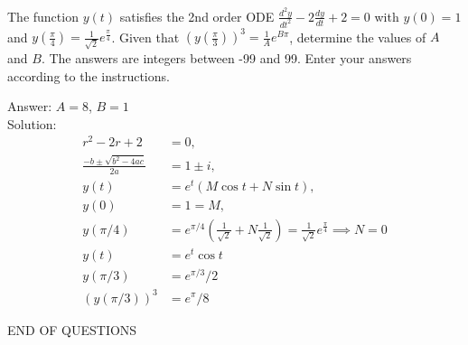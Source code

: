 \documentclass{uob-cs-exam}
\begin{document}
\begin{questions}



\question[5]
The function $y(t)$ satisfies the 2nd order ODE $\frac{d^2y}{dt^2} -2\frac{dy}{dt} +2=0$ with $y(0)=1$ and $y\left( \frac{\pi}{4} \right) = \frac{1}{\sqrt{2}}e^{\frac{\pi}{4}}$.
Given that $\left( y \left( \frac{\pi}{3} \right)\right)^3 = \frac{1}{A}e^{B \pi}$, determine the values of $A$ and $B$. The answers are integers between -99 and 99. Enter your answers according to the instructions.

\droppoints

\begin{solution}
Answer: $A=8$, $B=1$\\
Solution:\\
\begin{align*}
  r^2-2r+2 &= 0, \\
  \frac{-b \pm \sqrt{b^2 - 4ac}}{2a} &= 1 \pm i, \\
  y(t) &= e^t \left(M \cos t + N \sin t \right), \\
  y(0) &= 1 = M, \\
  y(\pi / 4) &= e^{\pi / 4} \left( \frac{1}{\sqrt{2}} + N \frac{1}{\sqrt{2}}\right) = \frac{1}{\sqrt{2}}e^{\frac{\pi}{4}} \implies N=0 \\
  y(t) &= e^t \cos t \\
  y(\pi / 3) &= e^{\pi / 3} / 2 \\
  \left( y(\pi / 3) \right)^3 &= e^\pi / 8
\end{align*}
\end{solution}

\vspace{5ex}



\end{questions}

\begin{center}END OF QUESTIONS\end{center}
\end{document}
